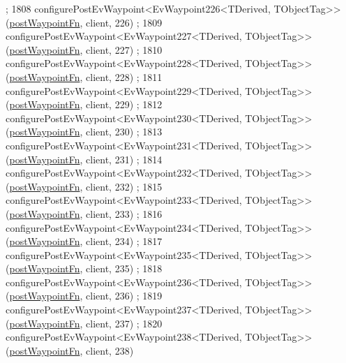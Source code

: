 \begin{DoxyCode}
      ;
1808     configurePostEvWaypoint<EvWaypoint226<TDerived, TObjectTag>>(\hyperlink{classcl__move__base__z_1_1WaypointEventDispatcher_a964a57fcce5d48ec60243230722d8dd7}{postWaypointFn}, client, 226)
      ;
1809     configurePostEvWaypoint<EvWaypoint227<TDerived, TObjectTag>>(\hyperlink{classcl__move__base__z_1_1WaypointEventDispatcher_a964a57fcce5d48ec60243230722d8dd7}{postWaypointFn}, client, 227)
      ;
1810     configurePostEvWaypoint<EvWaypoint228<TDerived, TObjectTag>>(\hyperlink{classcl__move__base__z_1_1WaypointEventDispatcher_a964a57fcce5d48ec60243230722d8dd7}{postWaypointFn}, client, 228)
      ;
1811     configurePostEvWaypoint<EvWaypoint229<TDerived, TObjectTag>>(\hyperlink{classcl__move__base__z_1_1WaypointEventDispatcher_a964a57fcce5d48ec60243230722d8dd7}{postWaypointFn}, client, 229)
      ;
1812     configurePostEvWaypoint<EvWaypoint230<TDerived, TObjectTag>>(\hyperlink{classcl__move__base__z_1_1WaypointEventDispatcher_a964a57fcce5d48ec60243230722d8dd7}{postWaypointFn}, client, 230)
      ;
1813     configurePostEvWaypoint<EvWaypoint231<TDerived, TObjectTag>>(\hyperlink{classcl__move__base__z_1_1WaypointEventDispatcher_a964a57fcce5d48ec60243230722d8dd7}{postWaypointFn}, client, 231)
      ;
1814     configurePostEvWaypoint<EvWaypoint232<TDerived, TObjectTag>>(\hyperlink{classcl__move__base__z_1_1WaypointEventDispatcher_a964a57fcce5d48ec60243230722d8dd7}{postWaypointFn}, client, 232)
      ;
1815     configurePostEvWaypoint<EvWaypoint233<TDerived, TObjectTag>>(\hyperlink{classcl__move__base__z_1_1WaypointEventDispatcher_a964a57fcce5d48ec60243230722d8dd7}{postWaypointFn}, client, 233)
      ;
1816     configurePostEvWaypoint<EvWaypoint234<TDerived, TObjectTag>>(\hyperlink{classcl__move__base__z_1_1WaypointEventDispatcher_a964a57fcce5d48ec60243230722d8dd7}{postWaypointFn}, client, 234)
      ;
1817     configurePostEvWaypoint<EvWaypoint235<TDerived, TObjectTag>>(\hyperlink{classcl__move__base__z_1_1WaypointEventDispatcher_a964a57fcce5d48ec60243230722d8dd7}{postWaypointFn}, client, 235)
      ;
1818     configurePostEvWaypoint<EvWaypoint236<TDerived, TObjectTag>>(\hyperlink{classcl__move__base__z_1_1WaypointEventDispatcher_a964a57fcce5d48ec60243230722d8dd7}{postWaypointFn}, client, 236)
      ;
1819     configurePostEvWaypoint<EvWaypoint237<TDerived, TObjectTag>>(\hyperlink{classcl__move__base__z_1_1WaypointEventDispatcher_a964a57fcce5d48ec60243230722d8dd7}{postWaypointFn}, client, 237)
      ;
1820     configurePostEvWaypoint<EvWaypoint238<TDerived, TObjectTag>>(\hyperlink{classcl__move__base__z_1_1WaypointEventDispatcher_a964a57fcce5d48ec60243230722d8dd7}{postWaypointFn}, client, 238)

\end{DoxyCode}
